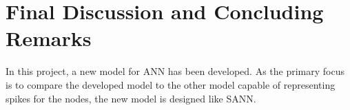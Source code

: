 	







%
%

\section{Final Discussion and Concluding Remarks}
In this project, a new model for ANN has been developed.
As the primary focus is to compare the developed model to the other model capable of representing spikes for the nodes, the new model is designed like SANN.

